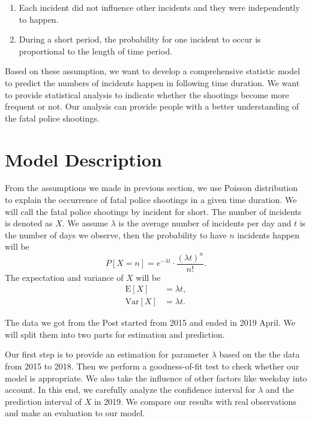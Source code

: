 \documentclass[11pt,a4paper,english]{article}
\begin{document}
\begin{enumerate}
    \item Each incident did not influence other incidents and they were independently to happen.
    \item During a short period, the probability for one incident to occur is proportional to the length of time period. 
\end{enumerate}
Based on these assumption, we want to develop a comprehensive statistic model to predict the numbers of incidents happen in following time duration. We want to provide statistical analysis to indicate whether the shootings become more frequent or not. Our analysis can provide people with a better understanding of the fatal police shootings.
\section{Model Description}
From the assumptions we made in previous section, we use Poisson distribution to explain the occurrence of fatal police shootings in a given time duration. 
We will call the fatal police shootings by incident for short. 
The number of incidents is denoted as $X$. We assume $\lambda$ is the average number of incidents per day and $t$ is the number of days we observe, then the probability to have $n$ incidents happen will be 
\begin{equation*}
	P[X = n] = e^{-\lambda t}\cdot\frac{(\lambda t)^{n}}{n!}.
\end{equation*}
The expectation and variance of $X$ will be
\begin{align*}
	\text{E}[X] &= \lambda t, \\
	\text{Var}[X] &= \lambda t.
\end{align*}

The data we got from the Post started from 2015 and ended in 2019 April. We will split them into two parts for estimation and prediction.

Our first step is to provide an estimation for parameter $\lambda$ based on the the data from 2015 to 2018. 
Then we perform a goodness-of-fit test to check whether our model is appropriate. 
We also take the influence of other factors like weekday into account. 
In this end, we carefully analyze the confidence interval for $\lambda$ and the prediction interval of $X$ in 2019. 
We compare our results with real observations and make an evaluation to our model. 
\end{document}
